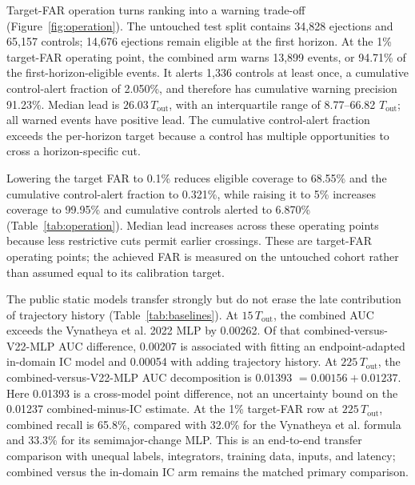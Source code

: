 \documentclass[linenumbers,twocolumn]{aastex702}
\newcommand{\Tout}{T_{\mathrm{out}}}
\begin{document}
Target-FAR operation turns ranking into a warning trade-off (Figure~\ref{fig:operation}). The untouched test split contains 34,828 ejections and 65,157 controls; 14,676 ejections remain eligible at the first horizon. At the 1\% target-FAR operating point, the combined arm warns 13,899 events, or 94.71\% of the first-horizon-eligible events. It alerts 1,336 controls at least once, a cumulative control-alert fraction of 2.050\%, and therefore has cumulative warning precision 91.23\%. Median lead is $26.03\,\Tout$, with an interquartile range of 8.77--66.82 $\Tout$; all warned events have positive lead. The cumulative control-alert fraction exceeds the per-horizon target because a control has multiple opportunities to cross a horizon-specific cut.

Lowering the target FAR to 0.1\% reduces eligible coverage to 68.55\% and the cumulative control-alert fraction to 0.321\%, while raising it to 5\% increases coverage to 99.95\% and cumulative controls alerted to 6.870\% (Table~\ref{tab:operation}). Median lead increases across these operating points because less restrictive cuts permit earlier crossings. These are target-FAR operating points; the achieved FAR is measured on the untouched cohort rather than assumed equal to its calibration target.

The public static models transfer strongly but do not erase the late contribution of trajectory history (Table~\ref{tab:baselines}). At $15\,\Tout$, the combined AUC exceeds the Vynatheya et al. 2022 MLP by 0.00262. Of that combined-versus-V22-MLP AUC difference, 0.00207 is associated with fitting an endpoint-adapted in-domain IC model and 0.00054 with adding trajectory history. At $225\,\Tout$, the combined-versus-V22-MLP AUC decomposition is 0.01393 $=0.00156+0.01237$. Here 0.01393 is a cross-model point difference, not an uncertainty bound on the 0.01237 combined-minus-IC estimate. At the 1\% target-FAR row at $225\,\Tout$, combined recall is 65.8\%, compared with 32.0\% for the Vynatheya et al. formula and 33.3\% for its semimajor-change MLP. This is an end-to-end transfer comparison with unequal labels, integrators, training data, inputs, and latency; combined versus the in-domain IC arm remains the matched primary comparison.
\end{document}
